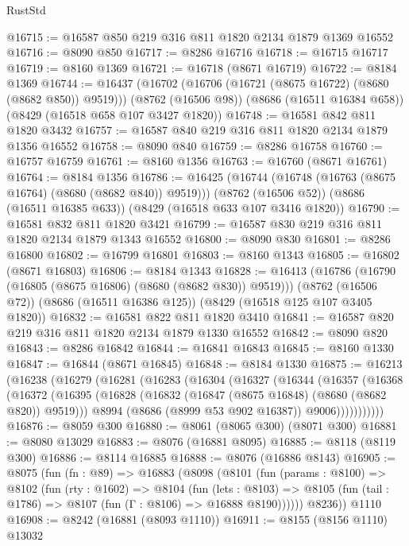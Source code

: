 \begin{lexlean}{RustStd}
\begin{coremodule}
@16715 := @16587 @850 @219 @316 @811 @1820 @2134 @1879 @1369 @16552
@16716 := @8090 @850
@16717 := @8286 @16716
@16718 := @16715 @16717
@16719 := @8160 @1369
@16721 := @16718 (@8671 @16719)
@16722 := @8184 @1369
@16744 := @16437
    (@16702 (@16706 (@16721 (@8675 @16722) (@8680 (@8682 @850)) @9519)))
    (@8762 (@16506 @98))
    (@8686 (@16511 @16384 @658))
    (@8429 (@16518 @658 @107 @3427 @1820))
@16748 := @16581 @842 @811 @1820 @3432
@16757 := @16587 @840 @219 @316 @811 @1820 @2134 @1879 @1356 @16552
@16758 := @8090 @840
@16759 := @8286 @16758
@16760 := @16757 @16759
@16761 := @8160 @1356
@16763 := @16760 (@8671 @16761)
@16764 := @8184 @1356
@16786 := @16425
    (@16744 (@16748 (@16763 (@8675 @16764) (@8680 (@8682 @840)) @9519)))
    (@8762 (@16506 @52))
    (@8686 (@16511 @16385 @633))
    (@8429 (@16518 @633 @107 @3416 @1820))
@16790 := @16581 @832 @811 @1820 @3421
@16799 := @16587 @830 @219 @316 @811 @1820 @2134 @1879 @1343 @16552
@16800 := @8090 @830
@16801 := @8286 @16800
@16802 := @16799 @16801
@16803 := @8160 @1343
@16805 := @16802 (@8671 @16803)
@16806 := @8184 @1343
@16828 := @16413
    (@16786 (@16790 (@16805 (@8675 @16806) (@8680 (@8682 @830)) @9519)))
    (@8762 (@16506 @72))
    (@8686 (@16511 @16386 @125))
    (@8429 (@16518 @125 @107 @3405 @1820))
@16832 := @16581 @822 @811 @1820 @3410
@16841 := @16587 @820 @219 @316 @811 @1820 @2134 @1879 @1330 @16552
@16842 := @8090 @820
@16843 := @8286 @16842
@16844 := @16841 @16843
@16845 := @8160 @1330
@16847 := @16844 (@8671 @16845)
@16848 := @8184 @1330
@16875 := @16213
    (@16238
      (@16279
        (@16281
          (@16283
            (@16304
              (@16327
                (@16344
                  (@16357
                    (@16368
                      (@16372
                        (@16395
                          (@16828 (@16832 (@16847 (@8675 @16848) (@8680 (@8682 @820)) @9519)))
                          @8994
                          (@8686 (@8999 @53 @902 @16387))
                          @9006)))))))))))
@16876 := @8059 @300
@16880 := @8061 (@8065 @300) (@8071 @300)
@16881 := @8080 @13029
@16883 := @8076 (@16881 @8095)
@16885 := @8118 (@8119 @300)
@16886 := @8114 @16885
@16888 := @8076 (@16886 @8143)
@16905 := @8075
    (fun (fn : @89) =>
    @16883
      (@8098
        (@8101
          (fun (params : @8100) =>
          @8102
            (fun (rty : @1602) =>
            @8104
              (fun (lets : @8103) =>
              @8105 (fun (tail : @1786) => @8107 (fun (Γ : @8106) => @16888 @8190))))))
        @8236))
    @1110
@16908 := @8242 (@16881 (@8093 @1110))
@16911 := @8155 (@8156 @1110) @13032

\end{coremodule}
\end{lexlean}
